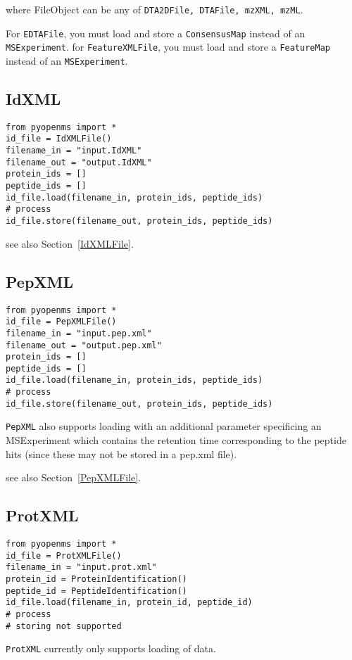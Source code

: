 \documentclass[10pt]{article}
\begin{document}
where FileObject can be any of \texttt{DTA2DFile, DTAFile, mzXML, mzML}.

For \texttt{EDTAFile}, you must load and store a \texttt{ConsensusMap} instead
of an \texttt{MSExperiment}.
for \texttt{FeatureXMLFile}, you must load and store a \texttt{FeatureMap} instead
of an \texttt{MSExperiment}.


\subsection{IdXML}
\begin{verbatim}
from pyopenms import *
id_file = IdXMLFile() 
filename_in = "input.IdXML"
filename_out = "output.IdXML"
protein_ids = []
peptide_ids = []
id_file.load(filename_in, protein_ids, peptide_ids)
# process 
id_file.store(filename_out, protein_ids, peptide_ids)
\end{verbatim}

see also Section~\ref{IdXMLFile}.

\subsection{PepXML}
\begin{verbatim}
from pyopenms import *
id_file = PepXMLFile() 
filename_in = "input.pep.xml"
filename_out = "output.pep.xml"
protein_ids = []
peptide_ids = []
id_file.load(filename_in, protein_ids, peptide_ids)
# process 
id_file.store(filename_out, protein_ids, peptide_ids)
\end{verbatim}

\texttt{PepXML} also supports loading with an additional parameter specificing
an MSExperiment which contains the retention time corresponding to the peptide
hits (since these may not be stored in a pep.xml file).

see also Section~\ref{PepXMLFile}.

\subsection{ProtXML}
\begin{verbatim}
from pyopenms import *
id_file = ProtXMLFile() 
filename_in = "input.prot.xml"
protein_id = ProteinIdentification()
peptide_id = PeptideIdentification()
id_file.load(filename_in, protein_id, peptide_id)
# process 
# storing not supported
\end{verbatim}

\texttt{ProtXML} currently only supports loading of data.
\end{document}
